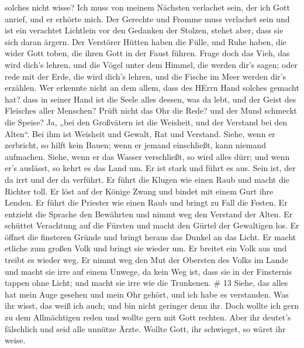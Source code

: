 solches nicht wisse?  Ich muss von meinem Nächsten verlachet
sein, der ich Gott anrief, und er erhörte mich. Der Gerechte und Fromme
muss verlachet sein  und ist ein verachtet Lichtlein vor den
Gedanken der Stolzen, stehet aber, dass sie sich daran ärgern.
 Der Verstörer Hütten haben die Fülle, und Ruhe haben, die
wider Gott toben, die ihren Gott in der Faust führen.  Frage
doch das Vieh, das wird dich's lehren, und die Vögel unter dem Himmel,
die werden dir's sagen;  oder rede mit der Erde, die wird
dich's lehren, und die Fische im Meer werden dir's erzählen.
 Wer erkennte nicht an dem allem, dass des HErrn Hand
solches gemacht hat?  dass in seiner Hand ist die Seele
alles dessen, was da lebt, und der Geist des Fleisches aller Menschen?
 Prüft nicht das Ohr die Rede? und der Mund schmeckt die
Speise?  Ja, „bei den Großvätern ist die Weisheit, und der
Verstand bei den Alten``.  Bei ihm ist Weisheit und Gewalt,
Rat und Verstand.  Siehe, wenn er zerbricht, so hilft kein
Bauen; wenn er jemand einschließt, kann niemand aufmachen. 
Siehe, wenn er das Wasser verschließt, so wird alles dürr; und wenn er's
auslässt, so kehrt es das Land um.  Er ist stark und führt
es aus. Sein ist, der da irrt und der da verführt.  Er
führt die Klugen wie einen Raub und macht die Richter toll.
 Er löst auf der Könige Zwang und bindet mit einem Gurt
ihre Lenden.  Er führt die Priester wie einen Raub und
bringt zu Fall die Festen.  Er entzieht die Sprache den
Bewährten und nimmt weg den Verstand der Alten.  Er
schüttet Verachtung auf die Fürsten und macht den Gürtel der Gewaltigen
los.  Er öffnet die finsteren Gründe und bringt heraus das
Dunkel an das Licht.  Er macht etliche zum großen Volk und
bringt sie wieder um. Er breitet ein Volk aus und treibt es wieder weg.
 Er nimmt weg den Mut der Obersten des Volks im Lande und
macht sie irre auf einem Unwege, da kein Weg ist,  dass sie
in der Finsternis tappen ohne Licht; und macht sie irre wie die
Trunkenen. \# 13  Siehe, das alles hat mein Auge gesehen und
mein Ohr gehört, und ich habe es verstanden.  Was ihr wisst,
das weiß ich auch; und bin nicht geringer denn ihr.  Doch
wollte ich gern zu dem Allmächtigen reden und wollte gern mit Gott
rechten.  Aber ihr deutet's fälschlich und seid alle unnütze
Ärzte.  Wollte Gott, ihr schwieget, so wäret ihr weise.
